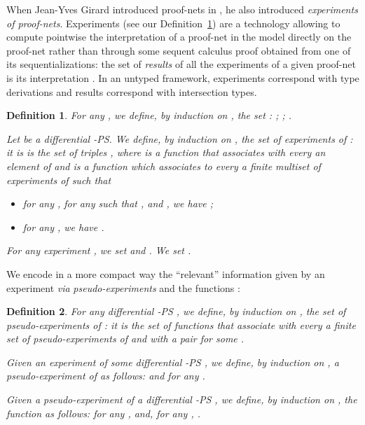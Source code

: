 \documentclass{article}
\theoremstyle{plain}
\newtheorem{definition}{Definition}
\begin{document}
When Jean-Yves Girard introduced proof-nets in \cite{ll}, he also introduced \emph{experiments of proof-nets}. Experiments (see our Definition~\ref{defin: experiment}) are a technology allowing to compute pointwise the interpretation  of a proof-net  in the model directly on the proof-net rather than through some sequent calculus proof obtained from one of its sequentializations: the set of \emph{results} of all the experiments of a given proof-net is its interpretation . In an untyped framework, experiments correspond with type derivations and results correspond with intersection types. 



\begin{definition}\label{defin: experiment}
For any , we define, by induction on , the set : ; ; .

Let  be a differential -PS. We define, by induction on , the set of \emph{experiments of }: it is is the set of triples , where  is a function that associates with every  an element of  and  is a function which associates to every  a finite multiset of experiments of  such that
\begin{itemize}
\item for any , for any  such that ,  and , we have ;
\item for any ,
we have  .
\end{itemize}
For any experiment , we set  and . We set   .
\end{definition}

We encode in a more compact way the ``relevant'' information given by an experiment \emph{via} \emph{pseudo-experiments} and the functions :

\begin{definition}\label{defin: experiment induces pseudo-experiment}
For any differential -PS , we define, by induction on , the set of \emph{pseudo-experiments of }: it is the set of functions that associate with every  a finite set of pseudo-experiments of  and with  a pair  for some .

Given an experiment  of some differential -PS , we define, by induction on , a pseudo-experiment  of  as follows:  and   for any .

Given a pseudo-experiment  of a differential -PS , we define, by induction on , the function  as follows: for any ,  and, for any , .
\end{definition}
\end{document}
